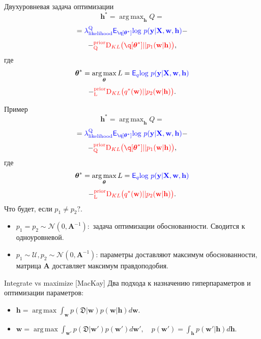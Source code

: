 \documentclass[usenames,dvipsnames,10pt,pdf,utf8,russian,aspectratio=43]{beamer}
\DeclareMathOperator*{\argmax}{arg\,max}
\begin{document}
\begin{frame}{Двухуровневая задача оптимизации}
\[
\mathbf{h}^{*} = \argmax_{\mathbf{h}} Q = 
\]
\[
= \textcolor{blue}{\lamLL\mathsf{E}_{\q[\teta^{*}]} \text{log}~{p(\mathbf{y} | \mathbf{X}, \mathbf{w}, \mathbf{h})}}
 -\]
\vspace{-0.3cm}
\[- \textcolor{red}{^\text{prior}_\text{Q}\text{D}_{KL}\bigl(\q[\teta^{*}] || p_1(\mathbf{w} |\mathbf{h}) \bigr)},\]
где 
\[
\teta^{*} = \argmax_{\teta} L = 
\textcolor{blue}{\mathsf{E}_q \text{log}~{p(\mathbf{y} | \mathbf{X}, \mathbf{w}, \mathbf{h})}}
\]
\vspace{-0.3cm}
\[- \textcolor{red}{^\text{prior}_\text{L}\text{D}_{KL}\bigl( q^{*}(\mathbf{w}) || p_2(\mathbf{w} |\mathbf{h}) \bigr)}.
\]

\end{frame}

\begin{frame}{Пример}
\[
\mathbf{h}^{*} = \argmax_{\mathbf{h}} Q = 
\]
\[
= \textcolor{blue}{\lamLL\mathsf{E}_{\q[\teta^{*}]} \text{log}~{p(\mathbf{y} | \mathbf{X}, \mathbf{w}, \mathbf{h})}}
 -\]
\vspace{-0.3cm}
\[- \textcolor{red}{^\text{prior}_\text{Q}\text{D}_{KL}\bigl(\q[\teta^{*}] || p_1(\mathbf{w} |\mathbf{h}) \bigr)},\]
где 
\[
\teta^{*} = \argmax_{\teta} L = 
\textcolor{blue}{\mathsf{E}_q \text{log}~{p(\mathbf{y} | \mathbf{X}, \mathbf{w}, \mathbf{h})}}
\]
\vspace{-0.3cm}
\[- \textcolor{red}{^\text{prior}_\text{L}\text{D}_{KL}\bigl( q^{*}(\mathbf{w}) || p_2(\mathbf{w} |\mathbf{h}) \bigr)}.
\]
Что будет, если $p_1 \neq p_2?$.
\begin{itemize}
\item $p_1 = p_2 \sim  \mathcal{N}(0, \mathbf{A}^{-1}):$ задача оптимизации обоснованности. Сводится к одноуровневой.
\item $p_1 \sim \mathcal{U}, p_2 \sim \mathcal{N}(0, \mathbf{A}^{-1})$: параметры доставляют максимум обоснованности, матрица $\mathbf{A}$ доставляет максимум правдоподобия. 
\end{itemize}

\end{frame}

\begin{frame}{Integrate vs maximize [MacKay]}
Два подхода к назначению гиперпараметров и оптимизации параметров:
\begin{itemize}
\item $\mathbf{h} = \argmax \int_{\mathbf{w}} p(\mathfrak{D}|\mathbf{w})p(\mathbf{w}|\mathbf{h})d\mathbf{w}.$
\item $\mathbf{w} =  \argmax \int_{\mathbf{w}'} p(\mathfrak{D}|\mathbf{w}')p(\mathbf{w}')d\mathbf{w}', \quad p(\mathbf{w}') = \int_{\mathbf{h}} p(\mathbf{w}'|\mathbf{h})d\mathbf{h}.$ 
\end{itemize}
\end{frame}
\end{document}
